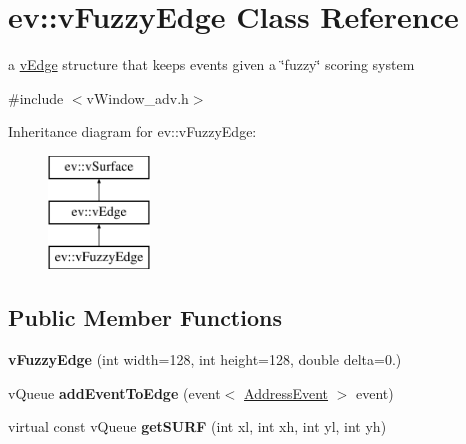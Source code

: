 \hypertarget{classev_1_1vFuzzyEdge}{}\section{ev\+:\+:v\+Fuzzy\+Edge Class Reference}
\label{classev_1_1vFuzzyEdge}


a \hyperlink{classev_1_1vEdge}{v\+Edge} structure that keeps events given a \char`\"{}fuzzy\char`\"{} scoring system  




{\ttfamily \#include $<$v\+Window\+\_\+adv.\+h$>$}

Inheritance diagram for ev\+:\+:v\+Fuzzy\+Edge\+:\begin{figure}[H]
\begin{center}
\leavevmode
\includegraphics[height=3.000000cm]{classev_1_1vFuzzyEdge}
\end{center}
\end{figure}
\subsection*{Public Member Functions}
\begin{DoxyCompactItemize}
\item 
{\bfseries v\+Fuzzy\+Edge} (int width=128, int height=128, double delta=0.)\hypertarget{classev_1_1vFuzzyEdge_a4fa6e20618a528a591baf2f098cace53}{}\label{classev_1_1vFuzzyEdge_a4fa6e20618a528a591baf2f098cace53}

\item 
v\+Queue {\bfseries add\+Event\+To\+Edge} (event$<$ \hyperlink{classev_1_1AddressEvent}{Address\+Event} $>$ event)\hypertarget{classev_1_1vFuzzyEdge_a61803b783119945df5c130c12d99e9c2}{}\label{classev_1_1vFuzzyEdge_a61803b783119945df5c130c12d99e9c2}

\item 
virtual const v\+Queue {\bfseries get\+S\+U\+RF} (int xl, int xh, int yl, int yh)\hypertarget{classev_1_1vFuzzyEdge_a335aeb48314d3e2068a55ee0a6958643}{}\label{classev_1_1vFuzzyEdge_a335aeb48314d3e2068a55ee0a6958643}

\end{DoxyCompactItemize}
